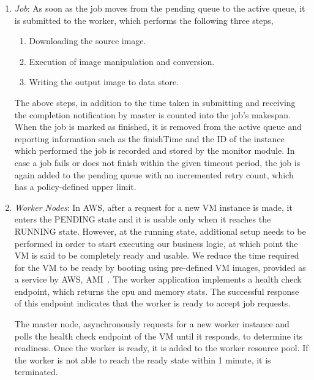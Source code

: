 \documentclass[a4paper]{IEEEtran}
\begin{document}
\begin{enumerate}
  \item \emph{Job}: As soon as the job moves from the pending queue to the active queue, it is submitted to the worker, which performs the following three steps,
  \begin{enumerate}
    \item Downloading the source image.
    \item Execution of image manipulation and conversion.
    \item Writing the output image to data store.
  \end{enumerate} 
  The above steps, in addition to the time taken in submitting and receiving the completion notification by master
  is counted into the job's makespan. When the job is marked as finished, it is removed from the active queue
  and reporting information such as the finishTime and the ID of the instance which performed the job is recorded
  and stored by the monitor module. In case a job fails or does not finish within the given timeout period, the 
  job is again added to the pending queue with an incremented retry count, which has a policy-defined upper limit.

  \item \emph{Worker Nodes}: In AWS, after a request for a new VM instance is made, it enters the \textsc{PENDING}
  state and it is usable only when it reaches the \textsc{RUNNING} state. However, at the running state, additional
  setup needs to be performed in order to start executing our business logic, at which point the VM is said to be
  completely ready and usable. We reduce the time required for the VM to be ready by booting using pre-defined
  VM images, provided as a service by AWS, AMI~\cite{aws-ami}. The worker application implements a health check
  endpoint, which returns the cpu and memory stats. The successful response of this endpoint indicates that the
  worker is ready to accept job requests.

  The master node, asynchronously requests for a new worker instance and polls the health check endpoint of
  the VM until it responds, to determine its readiness. Once the worker is ready, it is added to the worker resource
  pool. If the worker is not able to reach the ready state within 1 minute, it is terminated.


\end{enumerate}
\end{document}

